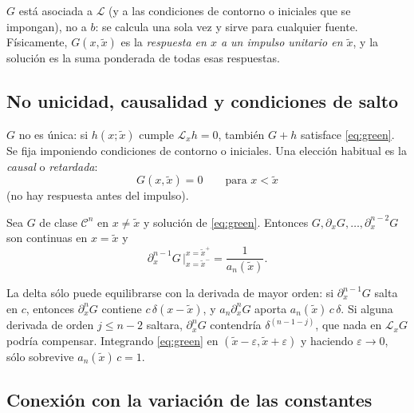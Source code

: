 \documentclass[11pt,twoside]{article}
\newcommand\Lop{\mathcal L}
\newcommand\Cl{\mathcal C}
\newcommand\xt{\tilde x}
\begin{document}
\begin{observacion}\label{obs:operador}
$G$ está asociada a $\Lop$ (y a las condiciones de contorno o iniciales que se impongan), no a $b$: se calcula una sola vez
y sirve para cualquier fuente. Físicamente, $G(x,\xt)$ es la \emph{respuesta en $x$ a un impulso unitario en $\xt$}, y la
solución es la suma ponderada de todas esas respuestas.
\end{observacion}

\subsection{No unicidad, causalidad y condiciones de salto}

$G$ no es única: si $h(x;\xt)$ cumple $\Lop_xh=0$, también $G+h$ satisface \eqref{eq:green}. Se fija imponiendo condiciones
de contorno o iniciales. Una elección habitual es la \emph{causal} o \emph{retardada}:
\begin{equation}\label{eq:causal}
G(x,\xt)=0\qquad\text{para }x<\xt
\end{equation}
(no hay respuesta antes del impulso).

\begin{proposicion}\label{prop:salto}
Sea $G$ de clase $\Cl^n$ en $x\neq\xt$ y solución de \eqref{eq:green}. Entonces $G,\partial_xG,\dots,\partial_x^{n-2}G$ son
continuas en $x=\xt$ y
\begin{equation}\label{eq:salto}
\partial_x^{n-1}G\,\Big|_{x=\xt^-}^{x=\xt^+}=\frac{1}{a_n(\xt)}.
\end{equation}
\end{proposicion}

\begin{justificacion}
La delta sólo puede equilibrarse con la derivada de mayor orden: si $\partial_x^{n-1}G$ salta en $c$, entonces
$\partial_x^nG$ contiene $c\,\delta(x-\xt)$, y $a_n\partial_x^nG$ aporta $a_n(\xt)\,c\,\delta$. Si alguna derivada de orden
$j\le n-2$ saltara, $\partial_x^nG$ contendría $\delta^{(n-1-j)}$, que nada en $\Lop_xG$ podría compensar. Integrando
\eqref{eq:green} en $(\xt-\varepsilon,\xt+\varepsilon)$ y haciendo $\varepsilon\to0$, sólo sobrevive $a_n(\xt)\,c=1$.
\end{justificacion}

\subsection{Conexión con la variación de las constantes}
\end{document}
